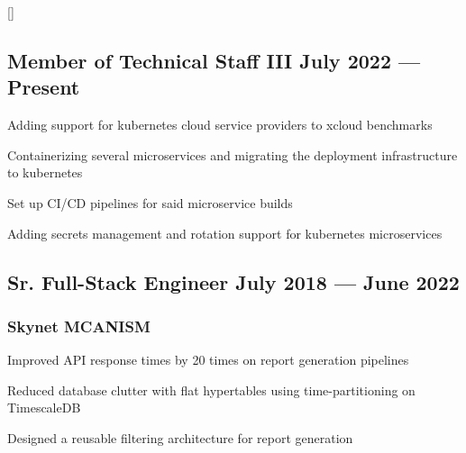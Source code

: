 \documentclass[letter,10pt]{article}
\begin{document}
\titlespacing*{\subsubsection}{0em}{0em}{0em}
\titleformat{\subsubsection}{\itshape}{}{0em}{}[]


\subsection{{Member of Technical Staff III \hfill July 2022 --- Present}}
\begin{zitemize}
\item Adding support for kubernetes cloud service providers to xcloud benchmarks
\item Containerizing several microservices and migrating the deployment infrastructure to kubernetes
\item Set up CI/CD pipelines for said microservice builds
\item Adding secrets management and rotation support for kubernetes microservices
\end{zitemize}


\subsection{{Sr. Full-Stack Engineer \hfill July 2018 --- June 2022}}

\vspace{1em}
\subsubsection*{Skynet MCANISM}
\begin{zitemize}
\item Improved API response times by 20 times on report generation pipelines
\item Reduced database clutter with flat hypertables using time-partitioning on TimescaleDB
\item Designed a reusable filtering architecture for report generation
\end{zitemize}
\end{document}
